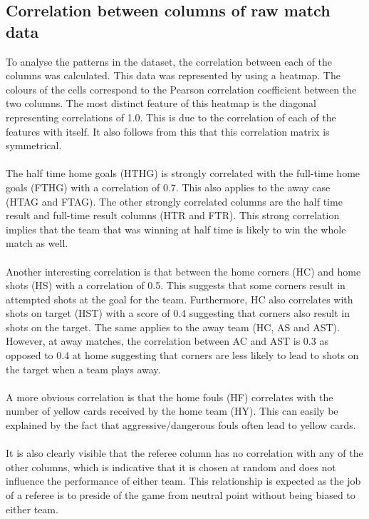 \documentclass[a4paper,12pt]{article}
\begin{document}
	\subsection{Correlation between columns of raw match data }
	
		To analyse the patterns in the dataset, the correlation between each of the columns was calculated. This data was represented by using a heatmap. The colours of the cells correspond to the Pearson correlation coefficient between the two columns. The most distinct feature of this heatmap is the diagonal representing correlations of 1.0. This is due to the correlation of each of the features with itself. It also follows from this that this correlation matrix is symmetrical.\\
		\\
		The half time home goals (HTHG) is strongly correlated with the full-time home goals (FTHG) with a correlation of 0.7. This also applies to the away case (HTAG and FTAG). The other strongly correlated columns are the half time result and full-time result columns (HTR and FTR). This strong correlation implies that the team that was winning at half time is likely to win the whole match as well.\\
		\\
		Another interesting correlation is that between the home corners (HC) and home shots (HS) with a correlation of 0.5. This suggests that some corners result in attempted shots at the goal for the team. Furthermore, HC also correlates with shots on target (HST) with a score of 0.4 suggesting that corners also result in shots on the target. The same applies to the away team (HC, AS and AST). However, at away matches, the correlation between AC and AST is 0.3 as opposed to 0.4 at home suggesting that corners are less likely to lead to shots on the target when a team plays away.\\
		\\
		A more obvious correlation is that the home fouls (HF) correlates with the number of yellow cards received by the home team (HY). This can easily be explained by the fact that aggressive/dangerous fouls often lead to yellow cards.\\
		\\
		It is also clearly visible that the referee column has no correlation with any of the other columns, which is indicative that it is chosen at random and does not influence the performance of either team. This relationship is expected as the job of a referee is to preside of the game from neutral point without being biased to either team.
		
\end{document}
